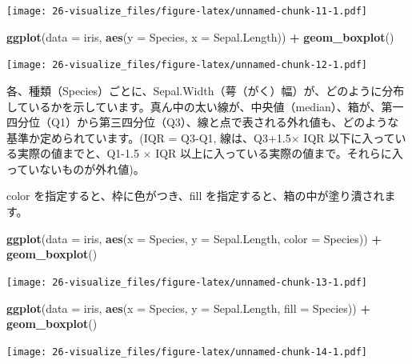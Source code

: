 \documentclass[
  xelatex, ja=standard]{bxjsbook}
\newenvironment{Shaded}{\begin{snugshade}}{\end{snugshade}}
\newcommand{\AttributeTok}[1]{\textcolor[rgb]{0.13,0.29,0.53}{#1}}
\newcommand{\FunctionTok}[1]{\textcolor[rgb]{0.13,0.29,0.53}{\textbf{#1}}}
\newcommand{\NormalTok}[1]{#1}
\newcommand{\SpecialCharTok}[1]{\textcolor[rgb]{0.81,0.36,0.00}{\textbf{#1}}}
\theoremstyle{definition}
\theoremstyle{definition}
\theoremstyle{definition}
\theoremstyle{definition}
\theoremstyle{remark}
\begin{document}
\texttt{[image: 26-visualize\_files/figure-latex/unnamed-chunk-11-1.pdf]}

\begin{Shaded}
\begin{Highlighting}[]
\FunctionTok{ggplot}\NormalTok{(}\AttributeTok{data =}\NormalTok{ iris, }\FunctionTok{aes}\NormalTok{(}\AttributeTok{y =}\NormalTok{ Species, }\AttributeTok{x =}\NormalTok{ Sepal.Length)) }\SpecialCharTok{+}
  \FunctionTok{geom\_boxplot}\NormalTok{()}
\end{Highlighting}
\end{Shaded}

\texttt{[image: 26-visualize\_files/figure-latex/unnamed-chunk-12-1.pdf]}

各、種類（Species）ごとに、Sepal.Width（萼（がく）幅）が、どのように分布しているかを示しています。真ん中の太い線が、中央値（median）、箱が、第一四分位（Q1）から第三四分位（Q3）、線と点で表される外れ値も、どのような基準か定められています。(IQR = Q3-Q1, 線は、Q3+1.5\(\times\) IQR 以下に入っている実際の値までと、Q1-1.5 \(\times\) IQR 以上に入っている実際の値まで。それらに入っていないものが外れ値)。

color を指定すると、枠に色がつき、fill を指定すると、箱の中が塗り潰されます。

\begin{Shaded}
\begin{Highlighting}[]
\FunctionTok{ggplot}\NormalTok{(}\AttributeTok{data =}\NormalTok{ iris, }\FunctionTok{aes}\NormalTok{(}\AttributeTok{x =}\NormalTok{ Species, }\AttributeTok{y =}\NormalTok{ Sepal.Length, }\AttributeTok{color =}\NormalTok{ Species)) }\SpecialCharTok{+}
  \FunctionTok{geom\_boxplot}\NormalTok{()}
\end{Highlighting}
\end{Shaded}

\texttt{[image: 26-visualize\_files/figure-latex/unnamed-chunk-13-1.pdf]}

\begin{Shaded}
\begin{Highlighting}[]
\FunctionTok{ggplot}\NormalTok{(}\AttributeTok{data =}\NormalTok{ iris, }\FunctionTok{aes}\NormalTok{(}\AttributeTok{x =}\NormalTok{ Species, }\AttributeTok{y =}\NormalTok{ Sepal.Length, }\AttributeTok{fill =}\NormalTok{ Species)) }\SpecialCharTok{+}
  \FunctionTok{geom\_boxplot}\NormalTok{()}
\end{Highlighting}
\end{Shaded}

\texttt{[image: 26-visualize\_files/figure-latex/unnamed-chunk-14-1.pdf]}
\end{document}
